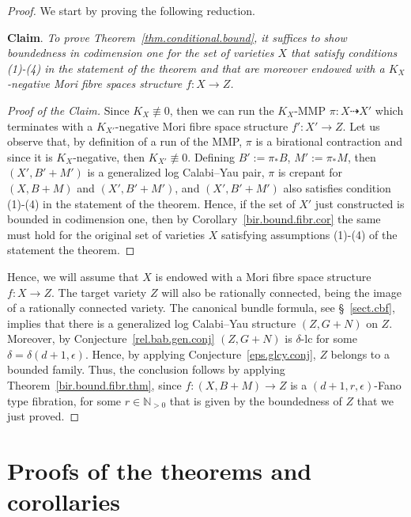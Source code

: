 \documentclass[11pt]{ip-journal}
\theoremstyle{definition}
\begin{document}
\begin{proof}
We start by proving the following reduction.

\medskip

{\bf Claim}.
{\it 
To prove Theorem~\ref{thm.conditional.bound}, it suffices to show boundedness in codimension one for the set of varieties
$X$ 
that satisfy conditions (1)-(4) in the statement of the theorem and that are moreover endowed with a 
$K_X$-negative 
Mori fibre spaces structure 
$f \colon X \to Z$.
}

\begin{proof}[Proof of the Claim]
Since 
$K_X \not \equiv 0$, 
then we can run the 
$K_X$-MMP
$\pi \colon X \dashrightarrow X'$ 
which terminates with a
$K_{X'}$-negative
Mori fibre space structure 
$f' \colon X' \to Z$.
Let us observe that, by definition of a run of the MMP, $\pi$ is a birational contraction and since it is
$K_{X}$-negative, 
then 
$K_{X'} \not \equiv 0$.
Defining 
$B':= \pi_\ast B$,
$M':= \pi_\ast M$, 
then 
$(X',B'+M')$
is a generalized log Calabi--Yau pair,
$\pi$ 
is crepant for 
$(X,B+M)$ 
and
$(X',B'+M')$, 
and 
$(X', B'+M')$
also satisfies condition (1)-(4) in the statement of the theorem.
Hence, if the set of $X'$ just constructed is bounded in codimension one, then by Corollary~\ref{bir.bound.fibr.cor} the same must hold for the original set of varieties $X$ satisfying assumptions (1)-(4) of the statement the theorem.
\end{proof}

Hence, we will assume that $X$ is endowed with a Mori fibre space structure $f \colon X \to Z$. 
The target variety $Z$ will also be rationally connected, being the image of a rationally connected variety.
The canonical bundle formula, see \S~\ref{sect.cbf}, implies that there is a generalized log Calabi--Yau structure $(Z, G+N)$ on $Z$.
Moreover, by Conjecture~\ref{rel.bab.gen.conj} $(Z, G+N)$ is $\delta$-lc for some $\delta=\delta(d+1, \epsilon)$.
Hence, by applying Conjecture~\ref{eps.glcy.conj}, $Z$ belongs to a bounded family.
Thus, the conclusion follows by applying Theorem~\ref{bir.bound.fibr.thm}, since
$f \colon (X, B+M) \to Z$ 
is a 
$(d+1, r, \epsilon)$-Fano 
type fibration, for some 
$r \in \mathbb N_{>0}$ 
that is given by the boundedness of 
$Z$ that we just proved.
\end{proof}


\section{Proofs of the theorems and corollaries}
\label{pf.sect}
\end{document}
